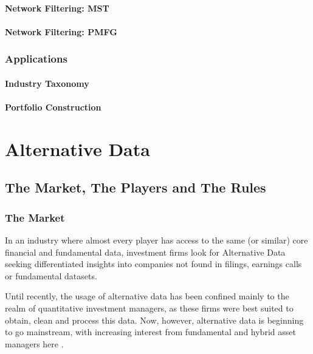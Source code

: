 \documentclass[]{book}
\theoremstyle{definition}
\theoremstyle{definition}
\theoremstyle{definition}
\theoremstyle{remark}
\begin{document}
\subsection{Network Filtering: MST}\label{network-filtering-mst}

\subsection{Network Filtering: PMFG}\label{network-filtering-pmfg}

\section{Applications}\label{applications}

\subsection{Industry Taxonomy}\label{industry-taxonomy}

\subsection{Portfolio Construction}\label{portfolio-construction}

\part{Alternative Data}\label{part-alternative-data}

\chapter{The Market, The Players and The
Rules}\label{the-market-the-players-and-the-rules}

\section{The Market}\label{the-market}

In an industry where almost every player has access to the same (or
similar) core financial and fundamental data, investment firms look for
Alternative Data seeking differentiated insights into companies not
found in filings, earnings calls or fundamental datasets.

Until recently, the usage of alternative data has been confined mainly
to the realm of quantitative investment managers, as these firms were
best suited to obtain, clean and process this data. Now, however,
alternative data is beginning to go mainstream, with increasing interest
from fundamental and hybrid asset managers here \citep{Greenwich_2019}.
\end{document}
